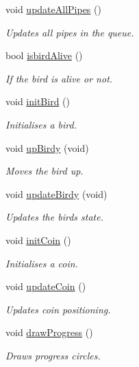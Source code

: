 \begin{DoxyCompactItemize}
void \hyperlink{group___flappy___bird_gab3c978c3d1d01f63bb632d6f49ed9c20}{update\+All\+Pipes} ()
\begin{DoxyCompactList}\small\item\em Updates all pipes in the queue. \end{DoxyCompactList}\item 
bool \hyperlink{group___flappy___bird_ga819692f49c5f4cc8981ef9509ac19630}{isbird\+Alive} ()
\begin{DoxyCompactList}\small\item\em If the bird is alive or not. \end{DoxyCompactList}\item 
void \hyperlink{group___flappy___bird_ga2aac1cc1c29f5be4955f4bbf802289c6}{init\+Bird} ()
\begin{DoxyCompactList}\small\item\em Initialises a bird. \end{DoxyCompactList}\item 
void \hyperlink{group___flappy___bird_gaf7865b4fde856c70ea4ec05b0ebb1dfe}{up\+Birdy} (void)
\begin{DoxyCompactList}\small\item\em Moves the bird up. \end{DoxyCompactList}\item 
void \hyperlink{group___flappy___bird_ga54cf26cd9679c160760e7f03f4ac2e93}{update\+Birdy} (void)
\begin{DoxyCompactList}\small\item\em Updates the birds state. \end{DoxyCompactList}\item 
void \hyperlink{group___flappy___bird_gaf8cb5edf1854b35a943571697abdcdec}{init\+Coin} ()
\begin{DoxyCompactList}\small\item\em Initialises a coin. \end{DoxyCompactList}\item 
void \hyperlink{group___flappy___bird_ga7ca93fcd8c7440e7b3f64c595a5be28c}{update\+Coin} ()
\begin{DoxyCompactList}\small\item\em Updates coin positioning. \end{DoxyCompactList}\item 
void \hyperlink{group___flappy___bird_gac05c4ab9e73e7da3aba0176b07d2be38}{draw\+Progress} ()
\begin{DoxyCompactList}\small\item\em Draws progress circles. \end{DoxyCompactList}\item 

\end{DoxyCompactItemize}
